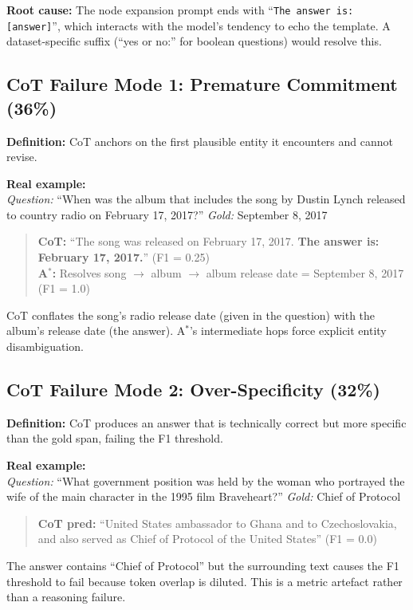 \documentclass{article}
\newcommand{\astar}{A$^*$\xspace}
\begin{document}
\textbf{Root cause:} The node expansion prompt ends with ``\texttt{The answer is: [answer]}'', which interacts with the model's tendency to echo the template. A dataset-specific suffix (``yes or no:'' for boolean questions) would resolve this.

\subsection{CoT Failure Mode 1: Premature Commitment (36\%)}

\textbf{Definition:} CoT anchors on the first plausible entity it encounters and cannot revise.

\textbf{Real example:}\\
\textit{Question:} ``When was the album that includes the song by Dustin Lynch released to country radio on February 17, 2017?'' \textit{Gold:} September 8, 2017

\begin{quote}
\textbf{CoT:} ``The song was released on February 17, 2017. \textbf{The answer is: February 17, 2017.}'' (F1 = 0.25)\\
\textbf{\astar:} Resolves song $\to$ album $\to$ album release date = September 8, 2017 (F1 = 1.0)
\end{quote}

CoT conflates the song's radio release date (given in the question) with the album's release date (the answer). \astar's intermediate hops force explicit entity disambiguation.

\subsection{CoT Failure Mode 2: Over-Specificity (32\%)}

\textbf{Definition:} CoT produces an answer that is technically correct but more specific than the gold span, failing the F1 threshold.

\textbf{Real example:}\\
\textit{Question:} ``What government position was held by the woman who portrayed the wife of the main character in the 1995 film Braveheart?'' \textit{Gold:} Chief of Protocol

\begin{quote}
\textbf{CoT pred:} ``United States ambassador to Ghana and to Czechoslovakia, and also served as Chief of Protocol of the United States'' (F1 = 0.0)
\end{quote}

The answer contains ``Chief of Protocol'' but the surrounding text causes the F1 threshold to fail because token overlap is diluted. This is a metric artefact rather than a reasoning failure.
\end{document}
